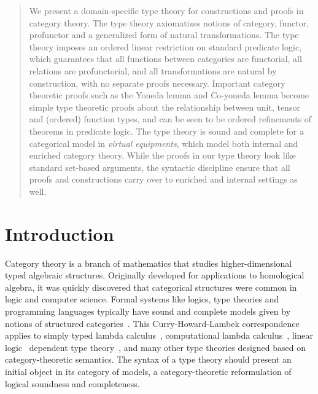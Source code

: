 \documentclass{llncs}
\begin{document}
\begin{abstract}
  We present a domain-specific type theory for constructions and proofs
  in category theory. The type theory axiomatizes notions of category,
  functor, profunctor and a generalized form of natural
  transformations. The type theory imposes an ordered linear restriction
  on standard predicate logic, which guarantees that all functions
  between categories are functorial, all relations are profunctorial,
  and all transformations are natural by construction, with no separate
  proofs necessary. Important category theoretic proofs such as the
  Yoneda lemma and Co-yoneda lemma become simple type theoretic proofs
  about the relationship between unit, tensor and (ordered) function
  types, and can be seen to be ordered refinements of theorems in
  predicate logic.  The type theory is sound and complete for a
  categorical model in \emph{virtual equipments}, which model both
  internal and enriched category theory. While the proofs in our type
  theory look like standard set-based arguments, the syntactic
  discipline ensure that all proofs and constructions carry over to
  enriched and internal settings as well.
\end{abstract}

\section{Introduction}

Category theory is a branch of mathematics that studies
higher-dimensional typed algebraic structures.
%
Originally developed for applications to homological algebra, it was
quickly discovered that categorical structures were common in logic and
computer science.  Formal systems like logics, type theories and
programming languages typically have sound and complete models given by
notions of structured categories~\cite{Lawvere69,LambekScott,moggi}.
%
This Curry-Howard-Lambek correspondence~
applies to simply typed lambda calculus~\cite{LambekScott},
computational lambda calculus~\cite{moggi}, linear logic~\cite{girard}
dependent type theory~\cite{cartmell1986}, and many other type theories
designed based on category-theoretic semantics.
%
The syntax of a type theory should present an initial object in its
category of models, a category-theoretic reformulation of logical
soundness and completeness.
\end{document}
